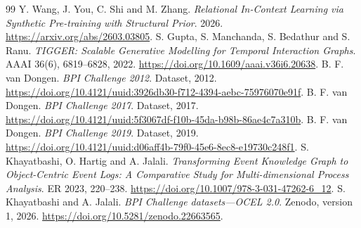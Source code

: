 \documentclass[11pt]{article}
\begin{document}
\begin{thebibliography}{99}
 Y. Wang, J. You, C. Shi and M. Zhang. \emph{Relational In-Context Learning via Synthetic Pre-training with Structural Prior}. 2026. \url{https://arxiv.org/abs/2603.03805}.
 S. Gupta, S. Manchanda, S. Bedathur and S. Ranu. \emph{TIGGER: Scalable Generative Modelling for Temporal Interaction Graphs}. AAAI 36(6), 6819--6828, 2022. \url{https://doi.org/10.1609/aaai.v36i6.20638}.
 B. F. van Dongen. \emph{BPI Challenge 2012}. Dataset, 2012. \url{https://doi.org/10.4121/uuid:3926db30-f712-4394-aebc-75976070e91f}.
 B. F. van Dongen. \emph{BPI Challenge 2017}. Dataset, 2017. \url{https://doi.org/10.4121/uuid:5f3067df-f10b-45da-b98b-86ae4c7a310b}.
 B. F. van Dongen. \emph{BPI Challenge 2019}. Dataset, 2019. \url{https://doi.org/10.4121/uuid:d06aff4b-79f0-45e6-8ec8-e19730c248f1}.
 S. Khayatbashi, O. Hartig and A. Jalali. \emph{Transforming Event Knowledge Graph to Object-Centric Event Logs: A Comparative Study for Multi-dimensional Process Analysis}. ER 2023, 220--238. \url{https://doi.org/10.1007/978-3-031-47262-6_12}.
 S. Khayatbashi and A. Jalali. \emph{BPI Challenge datasets---OCEL 2.0}. Zenodo, version 1, 2026. \url{https://doi.org/10.5281/zenodo.22663565}.
\end{thebibliography}
\end{document}
